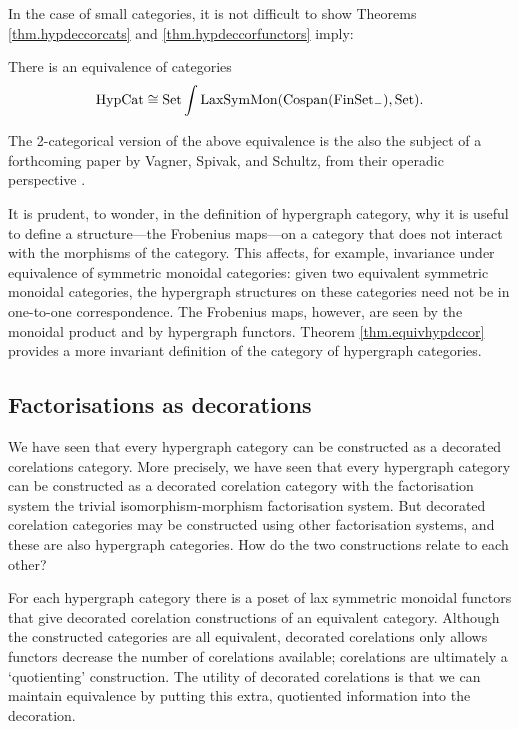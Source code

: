 In the case of small categories, it is not difficult to show Theorems
\ref{thm.hypdeccorcats} and \ref{thm.hypdeccorfunctors} imply:

\begin{theorem} \label{thm.equivhypdccor}
  There is an equivalence of categories
\[
  \mathrm{HypCat} \cong \mathrm{Set}\int \mathrm{LaxSymMon}(\operatorname{{Cospan}}(\mathrm{FinSet}_{-}), \mathrm{Set}).
\]
\end{theorem}

The 2-categorical version of the above equivalence is the also the subject of a
forthcoming paper by Vagner, Spivak, and Schultz, from their operadic
perspective \cite{SpiSchRup}.

\begin{remark}
  It is prudent, to wonder, in the definition of hypergraph category, why it is
  useful to define a structure---the Frobenius maps---on a category that does
  not interact with the morphisms of the category. This affects, for example,
  invariance under equivalence of symmetric monoidal categories: given two
  equivalent symmetric monoidal categories, the hypergraph structures on these
  categories need not be in one-to-one correspondence. The Frobenius maps,
  however, are seen by the monoidal product and by hypergraph functors. Theorem
  \ref{thm.equivhypdccor} provides a more invariant definition of the category
  of hypergraph categories.
\end{remark}

\subsection{Factorisations as decorations}

We have seen that every hypergraph category can be constructed as a decorated
corelations category. More precisely, we have seen that every hypergraph
category can be constructed as a decorated corelation category with the
factorisation system the trivial isomorphism-morphism factorisation system. But
decorated corelation categories may be constructed using other factorisation
systems, and these are also hypergraph categories. How do the two constructions
relate to each other?

For each hypergraph category there is a poset of lax symmetric monoidal functors
that give decorated corelation constructions of an equivalent category.
Although the constructed categories are all equivalent, decorated corelations
only allows functors decrease the number of corelations available; corelations
are ultimately a `quotienting' construction.  The utility of decorated
corelations is that we can maintain equivalence by putting this extra,
quotiented information into the decoration.

